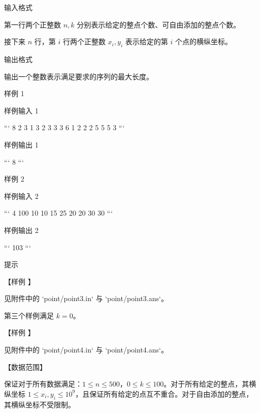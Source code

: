 \documentclass[12pt,twiside,a4paper]{ctexbook}
\numberwithin{chapter}{part}
\begin{document}
 输入格式

第一行两个正整数 $n, k$ 分别表示给定的整点个数、可自由添加的整点个数。

接下来 $n$ 行，第 $i$ 行两个正整数 $x_i, y_i$ 表示给定的第 $i$ 个点的横纵坐标。

 输出格式

输出一个整数表示满足要求的序列的最大长度。

 样例 1

 样例输入 1

```
8 2
3 1
3 2
3 3
3 6
1 2
2 2
5 5
5 3
```

 样例输出 1

```
8
```

 样例 2

 样例输入 2

```
4 100
10 10
15 25
20 20
30 30
```

 样例输出 2

```
103
```

 提示

【样例 】

见附件中的 `point/point3.in` 与 `point/point3.ans`。

第三个样例满足 $k = 0$。

【样例 】

见附件中的 `point/point4.in` 与 `point/point4.ans`。

【数据范围】

保证对于所有数据满足：$1 \leq n \leq 500$，$0 \leq k \leq 100$。对于所有给定的整点，其横纵坐标 $1 \leq x_i, y_i \leq {10}^9$，且保证所有给定的点互不重合。对于自由添加的整点，其横纵坐标不受限制。
\end{document}
